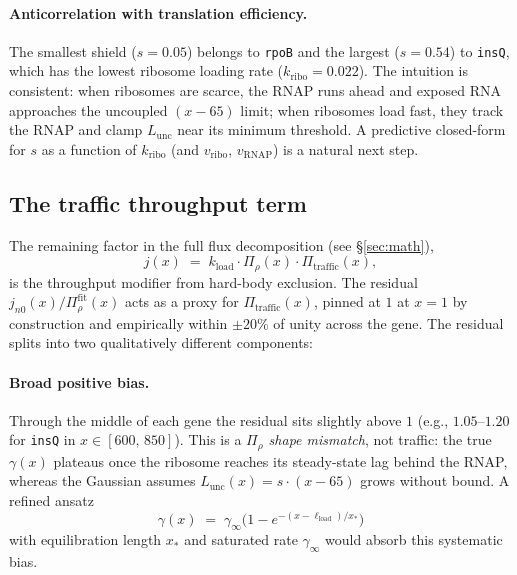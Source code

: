 \documentclass[11pt]{article}
\newcommand{\kload}{k_{\text{load}}}
\newcommand{\kribo}{k_{\text{ribo}}}
\begin{document}
\paragraph{Anticorrelation with translation efficiency.} The smallest
shield ($s = 0.05$) belongs to \texttt{rpoB} and the largest ($s = 0.54$)
to \texttt{insQ}, which has the lowest ribosome loading rate
($\kribo = 0.022$). The intuition is consistent: when ribosomes are
scarce, the RNAP runs ahead and exposed RNA approaches the uncoupled
$(x-65)$ limit; when ribosomes load fast, they track the RNAP and clamp
$L_{\text{unc}}$ near its minimum threshold. A predictive closed-form
for $s$ as a function of $\kribo$ (and $v_{\text{ribo}}$,
$v_{\text{RNAP}}$) is a natural next step.

\subsection{The traffic throughput term}

The remaining factor in the full flux decomposition (see
\S\ref{sec:math}),
\begin{equation}
  j(x) \;=\; \kload \cdot \Pi_\rho(x) \cdot \Pi_{\text{traffic}}(x),
\end{equation}
is the throughput modifier from hard-body exclusion. The residual
$j_{n0}(x) / \Pi_\rho^{\text{fit}}(x)$ acts as a proxy for
$\Pi_{\text{traffic}}(x)$, pinned at $1$ at $x=1$ by construction and
empirically within $\pm 20\%$ of unity across the gene. The residual
splits into two qualitatively different components:

\paragraph{Broad positive bias.} Through the middle of each gene the
residual sits slightly above $1$ (e.g., $1.05$--$1.20$ for \texttt{insQ}
in $x \in [600,\,850]$). This is a \emph{$\Pi_\rho$ shape mismatch},
not traffic: the true $\gamma(x)$ plateaus once the ribosome reaches
its steady-state lag behind the RNAP, whereas the Gaussian assumes
$L_{\text{unc}}(x) = s\cdot(x-65)$ grows without bound. A refined
ansatz
\begin{equation}
  \gamma(x) \;=\; \gamma_\infty\bigl(1 - e^{-(x-\ell_{\text{load}})/x_*}\bigr)
\end{equation}
with equilibration length $x_*$ and saturated rate $\gamma_\infty$
would absorb this systematic bias.
\end{document}
